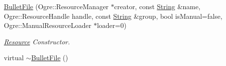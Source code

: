 \begin{DoxyCompactItemize}
\item 
\hyperlink{classMezzanine_1_1internal_1_1BulletFile_a6949f735118a623a291fe104e57e331a}{BulletFile} (Ogre::ResourceManager $\ast$creator, const \hyperlink{namespaceMezzanine_acf9fcc130e6ebf08e3d8491aebcf1c86}{String} \&name, Ogre::ResourceHandle handle, const \hyperlink{namespaceMezzanine_acf9fcc130e6ebf08e3d8491aebcf1c86}{String} \&group, bool isManual=false, Ogre::ManualResourceLoader $\ast$loader=0)
\begin{DoxyCompactList}\small\item\em \hyperlink{namespaceMezzanine_1_1Resource}{Resource} Constructor. \item\end{DoxyCompactList}\item 
\hypertarget{classMezzanine_1_1internal_1_1BulletFile_a421e96fa997cf967859f3f44f268638e}{
virtual \hyperlink{classMezzanine_1_1internal_1_1BulletFile_a421e96fa997cf967859f3f44f268638e}{$\sim$BulletFile} ()}
\label{classMezzanine_1_1internal_1_1BulletFile_a421e96fa997cf967859f3f44f268638e}


\end{DoxyCompactItemize}
